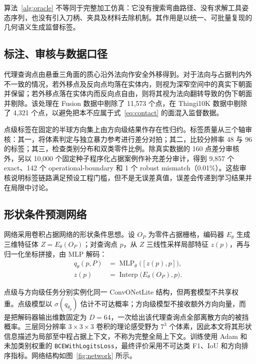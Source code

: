 算法~\ref{alg:oracle} 不等同于完整加工仿真：它没有搜索弯曲路径、没有求解工具姿态序列，也没有引入刀柄、夹具及材料去除机制。其作用是以统一、可批量复现的几何语义生成监督标签。

\subsection{标注、审核与数据口径}

代理查询点由悬垂三角面的质心沿外法向作安全外移得到。对于法向与占据判内外不一致的情况，若外移点及反向点均落在实体内，则视为深窄空间中的真实下朝面并保留；若外移点落在实体内而反向点自由，则将其视为法向翻转导致的伪下朝面并剔除。该处理在 Fusion 数据中剔除了 11,573 个点，在 Thingi10K 数据中剔除了 4,321 个点，以避免把本不应属于式~\eqref{eq:contact} 的面混入监督数据。

点级标签在固定的半球方向集上由方向级结果作存在性归约。标签质量从三个轴审核：其一，将体素判定与独立暴力参考进行差分对拍；其二，比较分辨率 48 与 96 的标签；其三，检查类别分布和双类零件比例。除真实数据的 160 点差分审核外，另以 10,000 个固定种子程序化占据案例作补充差分审计，得到 9,857 个 exact、142 个 operational-boundary 和 1 个 robust mismatch（0.01\%）。这些审核说明标签链路满足预设工程门槛，但不是无误差真值，误差会传递到学习结果并在局限中讨论。

\subsection{形状条件预测网络}

网络采用卷积占据网络的形状条件思想\cite{peng2020convonet}。设 $O_P$ 为零件占据栅格，编码器 $E_\theta$ 生成三维特征体 $Z=E_\theta(O_P)$；对查询点 $p$，从 $Z$ 三线性采样局部特征 $z(p)$，再与归一化坐标拼接，由 MLP 解码：
\begin{equation}
\begin{aligned}
q_\theta(p,P)&=\operatorname{MLP}_\theta\bigl([z(p),p]\bigr),\\
z(p)&=\operatorname{Interp}\bigl(E_\theta(O_P),p\bigr).
\end{aligned}
\label{eq:network}
\end{equation}

点级与方向级任务分别实例化同一 ConvONetLite 结构，但两套模型不共享权重。点级模型以 $\sigma(q_{\theta_p})$ 估计不可达概率；方向级模型不接收额外方向向量，而是把解码器输出维数固定为 $D=64$，一次给出该代理查询点全部离散方向的被挡概率。三层同分辨率 $3\times3\times3$ 卷积的理论感受野为 $7^3$ 个体素，因此本文将其形状信息描述为局部至中程占据上下文，不称为完整全局上下文。训练使用 Adam 和未加类别权重的 \texttt{BCEWithLogitsLoss}，最终评价采用不可达类 F1、IoU 和方向排序指标。网络结构如图~\ref{fig:network} 所示。

